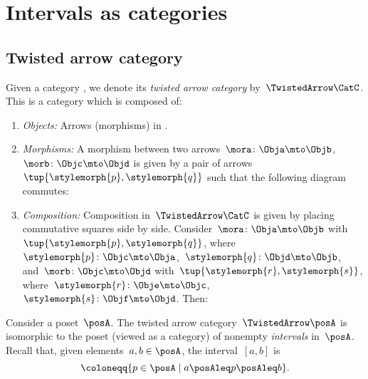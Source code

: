 
\section{Intervals as categories}

\subsection{Twisted arrow category}

\begin{ctdefinition}
    \label{def:twisted-arrow-category}
    \label{def:twisted-arrow}
    Given a category \CatC, we denote its \emph{twisted arrow category} by~$\TwistedArrow \CatC$.
    This is a category which is composed of:
    \begin{enumerate}
        \item \emph{Objects:} Arrows (morphisms) in \CatC.
        \item \emph{Morphisms:}
              A morphism between two arrows~$\mora\colon \Obja \mto \Objb $,~$\morb\colon \Objc \mto \Objd$ is given by a pair of arrows~$\tup{\stylemorph{p},\stylemorph{q}}$ such that the following diagram commutes:
              \begin{center}
              \end{center}
        \item \emph{Composition:} Composition in~$\TwistedArrow \CatC$ is given by placing commutative squares side by side.
              Consider~$\mora\colon \Obja \mto \Objb$ with~$\tup{\stylemorph{p},\stylemorph{q}}$, where~$\stylemorph{p}\colon \Objc\mto \Obja$,~$\stylemorph{q}\colon \Objd \mto \Objb$, and~$\morb\colon \Objc \mto \Objd$ with~$\tup{\stylemorph{r},\stylemorph{s}}$, where~$\stylemorph{r}\colon \Obje\mto \Objc$,~$\stylemorph{s}\colon \Objf \mto \Objd$.
              Then:
              \begin{center}
              \end{center}
    \end{enumerate}
\end{ctdefinition}

\begin{example}[Intervals]
    \label{exa:twisted-arrow-poset}
    Consider a poset~$\posA$.
    The twisted arrow category~$\TwistedArrow \posA$ is isomorphic to the poset (viewed as a category) of nonempty \emph{intervals} in~$\posA$.
    Recall that, given elements~$a, b \in \posA$, the interval~$[a,b]$ is
    \begin{equation*}
        [a,b]
        \coloneqq \{p \in \posA \mid a\posAleq p \posAleq b\}.
    \end{equation*}
\end{example}

